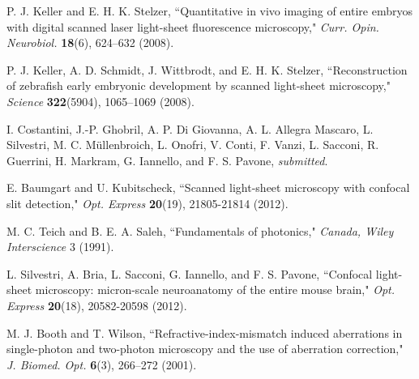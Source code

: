 \documentclass[12pt]{spieman}  %
\begin{document}
\begin{spacing}{2}
\begin{thebibliography}{0}
 P. J. Keller and E. H. K. Stelzer, ``Quantitative in vivo imaging of entire embryos with digital scanned laser light-sheet fluorescence microscopy," \emph{Curr. Opin. Neurobiol.} \textbf{18}(6), 624–632 (2008).

 P. J. Keller, A. D. Schmidt, J. Wittbrodt, and E. H. K. Stelzer, ``Reconstruction of zebrafish early embryonic development by scanned light-sheet microscopy," \emph{Science} \textbf{322}(5904), 1065–1069 (2008).

 I. Costantini, J.-P. Ghobril, A. P. Di Giovanna, A. L. Allegra Mascaro, L. Silvestri, M. C. M\"{u}llenbroich, L. Onofri, V. Conti, F. Vanzi, L. Sacconi, R. Guerrini, H. Markram, G. Iannello, and F. S. Pavone, \emph{submitted}.

 E. Baumgart and U. Kubitscheck, ``Scanned light-sheet microscopy with confocal slit detection," \emph{Opt. Express} \textbf{20}(19), 21805-21814 (2012).

%
%

 M. C. Teich and B. E. A. Saleh, ``Fundamentals of photonics," \emph{Canada, Wiley Interscience} 3 (1991).

 L. Silvestri, A. Bria, L. Sacconi, G. Iannello,  and F. S. Pavone,  ``Confocal light-sheet microscopy: micron-scale neuroanatomy of the entire mouse brain," \emph{Opt. Express} \textbf{20}(18), 20582-20598 (2012).

 M. J. Booth and T. Wilson, ``Refractive-index-mismatch induced aberrations in single-photon and two-photon microscopy and the use of aberration correction," \emph{J. Biomed. Opt.} \textbf{6}(3), 266–272 (2001).


\end{thebibliography}
\end{spacing}
\end{document}
